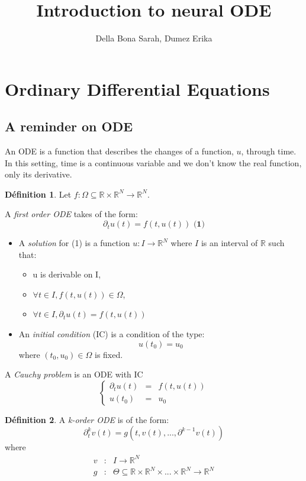 \documentclass[10pt,a4paper]{article}
\author{Della Bona Sarah, Dumez Erika}
\title{Introduction to neural ODE}
\theoremstyle{definition}
\newtheorem{definition}{Définition}
\theoremstyle{definition}
\begin{document}
\maketitle
 
 
\section{Ordinary Differential Equations}

\subsection{A reminder on ODE}

An ODE is a function that describes the changes of a function, $u$, through time. In this setting, time is a continuous variable and we don't know the real function, only its derivative.

\begin{definition}
Let $f: \Omega \subseteq \mathbb{R} \times \mathbb{R}^N \rightarrow \mathbb{R}^N$. 

A \textit{first order ODE} takes of the form:
\[
\partial_t u(t) = f(t,u(t)) \textbf{   (1)}
\]

\begin{itemize}
\item A \textit{solution} for (1) is a function $u : I \rightarrow \mathbb{R}^N$ where $I$ is an interval of $\mathbb{R}$ such that:
	\begin{itemize}
	\item u is derivable on I,
	\item $\forall t \in I, f(t, u(t)) \in \Omega$,
	\item $\forall t \in I, \partial_t u(t) = f(t, u(t))$
	\end{itemize}
\item An \textit{initial condition} (IC) is a condition of the type:
\[
u(t_0) = u_0
\]
where $(t_0, u_0) \in \Omega$ is fixed.
\end{itemize}
\item A \textit{Cauchy problem} is an ODE with IC
\[
\left \{
\begin{array}{rcl}
\partial_t u(t) & = & f(t, u(t)) \\
u(t_0) & = & u_0
\end{array}
\right.
\]
\end{definition}

\begin{definition}
A \textit{k-order ODE} is of the form:
\[
\partial^k_t v(t) = g(t, v(t), ... , \partial^{k-1}v(t))
\]
where 
   \begin{eqnarray}
   \nonumber
   v & : & I \rightarrow \mathbb{R}^N \\ 
   \nonumber
   g & : & \Theta \subseteq \mathbb{R} \times \mathbb{R}^N \times ... \times \mathbb{R}^N \rightarrow \mathbb{R}^N
   \end{eqnarray}
\end{definition}
\end{document}
